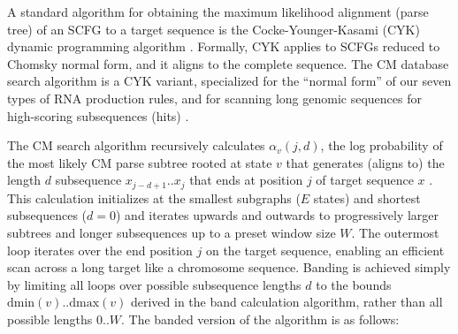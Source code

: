 \documentclass[11pt]{article}
\begin{document}
A standard algorithm for obtaining the maximum likelihood alignment
(parse tree) of an SCFG to a target sequence is the
Cocke-Younger-Kasami (CYK) dynamic programming algorithm
\cite{Kasami65,Younger67,HopcroftUllman79}. Formally, CYK applies to
SCFGs reduced to Chomsky normal form, and it aligns to the complete
sequence. The CM database search algorithm is a CYK variant,
specialized for the ``normal form'' of our seven types of RNA
production rules, and for scanning long genomic sequences for
high-scoring subsequences (hits) \cite{Durbin98}.

The CM search algorithm recursively calculates $\alpha_v(j,d)$, the
log probability of the most likely CM parse subtree rooted at state $v$
that generates (aligns to) the length $d$ subsequence $x_{j-d+1}..x_j$
that ends at position $j$ of target sequence $x$
\cite{Eddy94,Durbin98}. This calculation initializes at the smallest
subgraphs ($E$ states) and shortest subsequences ($d=0$) and iterates
upwards and outwards to progressively larger subtrees and longer
subsequences up to a preset window size $W$. The outermost loop
iterates over the end position $j$ on the target sequence, enabling an
efficient scan across a long target like a chromosome sequence.
Banding is achieved simply by limiting all loops over possible
subsequence lengths $d$ to the bounds $\mbox{dmin}(v)..\mbox{dmax}(v)$
derived in the band calculation algorithm, rather than all possible
lengths $0..W$. The banded version of the algorithm is as follows:
 
\end{document}
